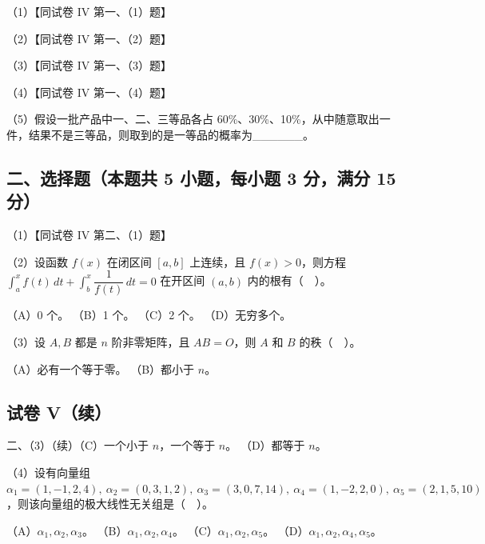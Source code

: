 \documentclass[UTF8,12pt]{ctexart}
\begin{document}
（1）【同试卷 IV 第一、（1）题】


（2）【同试卷 IV 第一、（2）题】


（3）【同试卷 IV 第一、（3）题】


（4）【同试卷 IV 第一、（4）题】


（5）假设一批产品中一、二、三等品各占 60\%、30\%、10\%，从中随意取出一件，结果不是三等品，则取到的是一等品的概率为\_\_\_\_\_\_。


\subsection*{二、选择题（本题共 5 小题，每小题 3 分，满分 15 分）}

（1）【同试卷 IV 第二、（1）题】


（2）设函数 \(\displaystyle f(x)\) 在闭区间 \(\displaystyle [a,\allowbreak b]\) 上连续，且 \(\displaystyle f(x)>0\)，则方程 \(\displaystyle \int_a^x f(t)\,dt+\displaystyle \int_b^x\dfrac{\displaystyle 1}{\displaystyle f(t)}\,dt=0\) 在开区间 \(\displaystyle (a,\allowbreak b)\) 内的根有（　）。


（A）0 个。 （B）1 个。 （C）2 个。 （D）无穷多个。


（3）设 \(\displaystyle A,\allowbreak B\) 都是 \(\displaystyle n\) 阶非零矩阵，且 \(\displaystyle AB=O\)，则 \(\displaystyle A\) 和 \(\displaystyle B\) 的秩（　）。


（A）必有一个等于零。 （B）都小于 \(\displaystyle n\)。


\subsection*{试卷 V（续）}

二、（3）（续）（C）一个小于 \(\displaystyle n\)，一个等于 \(\displaystyle n\)。 （D）都等于 \(\displaystyle n\)。


（4）设有向量组 \(\displaystyle \alpha_1=(1,\allowbreak -1,\allowbreak 2,\allowbreak 4),\allowbreak \ \alpha_2=(0,\allowbreak 3,\allowbreak 1,\allowbreak 2),\allowbreak \ \alpha_3=(3,\allowbreak 0,\allowbreak 7,\allowbreak 14),\allowbreak \ \alpha_4=(1,\allowbreak -2,\allowbreak 2,\allowbreak 0),\allowbreak \ \alpha_5=(2,\allowbreak 1,\allowbreak 5,\allowbreak 10)\)，则该向量组的极大线性无关组是（　）。


（A）\(\displaystyle \alpha_1,\allowbreak \alpha_2,\allowbreak \alpha_3\)。 （B）\(\displaystyle \alpha_1,\allowbreak \alpha_2,\allowbreak \alpha_4\)。 （C）\(\displaystyle \alpha_1,\allowbreak \alpha_2,\allowbreak \alpha_5\)。 （D）\(\displaystyle \alpha_1,\allowbreak \alpha_2,\allowbreak \alpha_4,\allowbreak \alpha_5\)。
\end{document}
